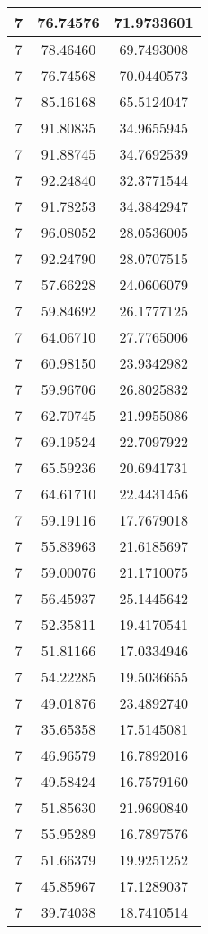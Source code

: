 \documentclass[
]{book}
\begin{document}
\begin{tabular}{c|c|c}
\hline
7 & 76.74576 & 71.9733601\\
\hline
7 & 78.46460 & 69.7493008\\
\hline
7 & 76.74568 & 70.0440573\\
\hline
7 & 85.16168 & 65.5124047\\
\hline
7 & 91.80835 & 34.9655945\\
\hline
7 & 91.88745 & 34.7692539\\
\hline
7 & 92.24840 & 32.3771544\\
\hline
7 & 91.78253 & 34.3842947\\
\hline
7 & 96.08052 & 28.0536005\\
\hline
7 & 92.24790 & 28.0707515\\
\hline
7 & 57.66228 & 24.0606079\\
\hline
7 & 59.84692 & 26.1777125\\
\hline
7 & 64.06710 & 27.7765006\\
\hline
7 & 60.98150 & 23.9342982\\
\hline
7 & 59.96706 & 26.8025832\\
\hline
7 & 62.70745 & 21.9955086\\
\hline
7 & 69.19524 & 22.7097922\\
\hline
7 & 65.59236 & 20.6941731\\
\hline
7 & 64.61710 & 22.4431456\\
\hline
7 & 59.19116 & 17.7679018\\
\hline
7 & 55.83963 & 21.6185697\\
\hline
7 & 59.00076 & 21.1710075\\
\hline
7 & 56.45937 & 25.1445642\\
\hline
7 & 52.35811 & 19.4170541\\
\hline
7 & 51.81166 & 17.0334946\\
\hline
7 & 54.22285 & 19.5036655\\
\hline
7 & 49.01876 & 23.4892740\\
\hline
7 & 35.65358 & 17.5145081\\
\hline
7 & 46.96579 & 16.7892016\\
\hline
7 & 49.58424 & 16.7579160\\
\hline
7 & 51.85630 & 21.9690840\\
\hline
7 & 55.95289 & 16.7897576\\
\hline
7 & 51.66379 & 19.9251252\\
\hline
7 & 45.85967 & 17.1289037\\
\hline
7 & 39.74038 & 18.7410514\\

\end{tabular}
\end{document}
